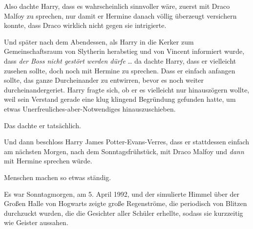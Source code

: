 Also dachte Harry, dass es wahrscheinlich sinnvoller wäre, zuerst mit Draco Malfoy zu sprechen, nur damit er Hermine danach völlig überzeugt versichern konnte, dass Draco wirklich nicht gegen sie intrigierte.

Und später nach dem Abendessen, als Harry in die Kerker zum Gemeinschaftsraum von Slytherin herabstieg und von Vincent informiert wurde, dass \emph{der Boss nicht gestört werden dürfe} … da dachte Harry, dass er vielleicht zusehen sollte, doch noch mit Hermine zu sprechen. Dass er einfach anfangen sollte, das ganze Durcheinander zu entwirren, bevor es noch weiter durcheinandergeriet. Harry fragte sich, ob er es vielleicht nur hinauszögern wollte, weil sein Verstand gerade eine klug klingend Begründung gefunden hatte, um etwas Unerfreuliches-aber-Notwendiges hinauszuschieben.

Das dachte er tatsächlich.

Und dann beschloss Harry James Potter-Evans-Verres, dass er stattdessen einfach am nächsten Morgen, nach dem Sonntagsfrühstück, mit Draco Malfoy und \emph{dann} mit Hermine sprechen würde.

Menschen machen so etwas ständig.

\later

Es war Sonntagmorgen, am 5. April 1992, und der simulierte Himmel über der Großen Halle von Hogwarts zeigte große Regenströme, die periodisch von Blitzen durchzuckt wurden, die die Gesichter aller Schüler erhellte, sodass sie kurzzeitig wie Geister aussahen.

